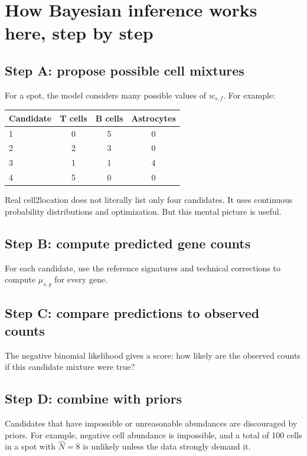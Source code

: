 \documentclass[11pt]{article}
\begin{document}
\section{How Bayesian inference works here, step by step}

\subsection{Step A: propose possible cell mixtures}

For a spot, the model considers many possible values of $w_{s,f}$. For example:

\begin{center}
\begin{tabular}{lccc}
\toprule
Candidate & T cells & B cells & Astrocytes \\
\midrule
1 & 0 & 5 & 0 \\
2 & 2 & 3 & 0 \\
3 & 1 & 1 & 4 \\
4 & 5 & 0 & 0 \\
\bottomrule
\end{tabular}
\end{center}

Real cell2location does not literally list only four candidates. It uses continuous probability distributions and optimization. But this mental picture is useful.

\subsection{Step B: compute predicted gene counts}

For each candidate, use the reference signatures and technical corrections to compute $\mu_{s,g}$ for every gene.

\subsection{Step C: compare predictions to observed counts}

The negative binomial likelihood gives a score: how likely are the observed counts if this candidate mixture were true?

\subsection{Step D: combine with priors}

Candidates that have impossible or unreasonable abundances are discouraged by priors. For example, negative cell abundance is impossible, and a total of 100 cells in a spot with $\hat N=8$ is unlikely unless the data strongly demand it.
\end{document}
